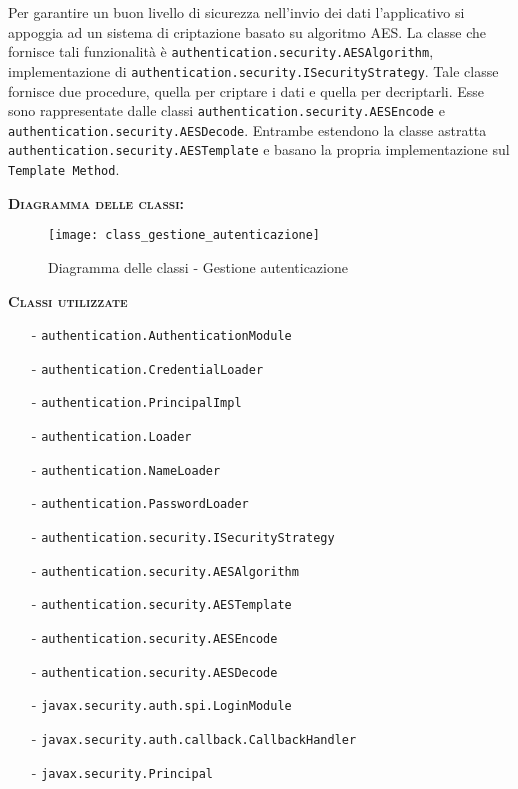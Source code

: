 \begin{description}
Per garantire un buon livello di sicurezza nell'invio dei dati l'applicativo si appoggia ad un sistema di criptazione basato su algoritmo AES. La classe che fornisce tali funzionalità è \texttt{authentication.security.AESAlgorithm}, implementazione di \texttt{authentication.security.ISecurityStrategy}. Tale classe fornisce due procedure, quella per criptare i dati e quella per decriptarli. Esse sono rappresentate dalle classi \texttt{authentication.security.AESEncode} e \texttt{authentication.security.AESDecode}. Entrambe estendono la classe astratta \texttt{authentication.security.AESTemplate} e basano la propria implementazione sul  \texttt{Template Method}.
  
  \item{\scshape\bfseries Diagramma delle classi:}
\begin{figure}[H]
  \centering
 \texttt{[image: class\_gestione\_autenticazione]}
  \caption{Diagramma delle classi - Gestione autenticazione}\label{fig:gestioneautenticazione}
\end{figure}	
  
  \item{\scshape\bfseries Classi utilizzate}
  \begin{itemize}
    \item[-] \texttt{authentication.AuthenticationModule}
	\item[-] \texttt{authentication.CredentialLoader}
	\item[-] \texttt{authentication.PrincipalImpl}
	\item[-] \texttt{authentication.Loader}
	\item[-] \texttt{authentication.NameLoader}
	\item[-] \texttt{authentication.PasswordLoader}
	\item[-] \texttt{authentication.security.ISecurityStrategy}
 	\item[-] \texttt{authentication.security.AESAlgorithm}
 	\item[-] \texttt{authentication.security.AESTemplate}
 	\item[-] \texttt{authentication.security.AESEncode}
 	\item[-] \texttt{authentication.security.AESDecode}	
 	\item[-] \texttt{javax.security.auth.spi.LoginModule}
 	\item[-] \texttt{javax.security.auth.callback.CallbackHandler}
 	\item[-] \texttt{javax.security.Principal}
  \end{itemize}

\end{description}

